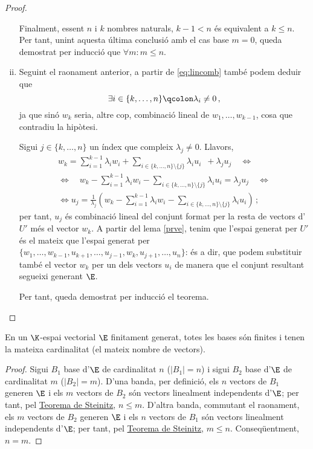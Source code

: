 \begin{specialteo}
\begin{proof}
\begin{enumerate}[i)]
			Finalment, essent $n$ i $k$ nombres naturals, $k-1 < n$ és equivalent a $k \le n$. Per tant, unint aquesta última conclusió amb el cas base $m=0$, queda demostrat per inducció que $\forall m \colon m \le n$.

			\item Seguint el raonament anterior, a partir de \eqref{eq:lincomb} també podem deduir que \[\exists i\in\{k,\ldots,n\}\qcolon \lambda_i \ne 0\,,\] ja que sinó $w_k$ seria, altre cop, combinació lineal de $w_1, \ldots, w_{k-1}$, cosa que contradiu la hipòtesi.
			
			Sigui $j\in\{k, \ldots, n\}$ un índex que compleix $\lambda_j \ne 0$. Llavors,
			\begin{gather*}
				w_k = \sum_{i=1}^{k-1} \lambda_i w_i + \sum_{i \in \{k, \ldots, n\}\setminus \{j\}} \lambda_i u_i  \ \;+ \lambda_j u_j\quad\Leftrightarrow\\
				\Leftrightarrow\quad w_k - \sum_{i=1}^{k-1} \lambda_i w_i - \sum_{i \in \{k, \ldots, n\}\setminus \{j\}} \lambda_i u_i = \lambda_j u_j\quad\Leftrightarrow\\
				\Leftrightarrow u_j = \frac{1}{\lambda_j}\left(w_k - \sum_{i=1}^{k-1} \lambda_i w_i - \sum_{i \in \{k, \ldots, n\}\setminus \{j\}} \lambda_i u_i\right)\,;
			\end{gather*}
			per tant, $u_j$ és combinació lineal del conjunt format per la resta de vectors d'$U'$ més el vector $w_k$. A partir del lema \ref{prve}, tenim que l'espai generat per $U'$ és el mateix que l'espai generat per $\{w_1, \ldots, w_{k-1}, u_{k+1}, \ldots, u_{j-1}, w_k, u_{j+1} , \ldots, u_n\}$: és a dir, que podem substituir també el vector $w_k$ per un dels vectors $u_i$ de manera que el conjunt resultant segueixi generant $\E$. 
			
			Per tant, queda demostrat per inducció el teorema.
		\end{enumerate}
	\end{proof}
	
	\begin{col}
		En un $\K$-espai vectorial $\E$ finitament generat, totes les bases són finites i tenen la mateixa cardinalitat (el mateix nombre de vectors).
	\end{col}
	
	\begin{proof} Sigui $B_1$ base d'$\E$  de cardinalitat $n$ ($|B_1| = n$) i sigui $B_2$ base d'$\E$ de cardinalitat $m$ ($|B_2| = m$). D'una banda, per definició, els $n$ vectors de $B_1$ generen $\E$ i els $m$ vectors de $B_2$ són vectors linealment independents d'$\E$; per tant, pel \hyperref[teo:steinitz]{Teorema de Steinitz}, $n \le m$. D'altra banda, commutant el raonament, els $m$ vectors de $B_2$ generen $\E$ i els $n$ vectors de $B_1$ són vectors linealment independents d'$\E$; per tant, pel \hyperref[teo:steinitz]{Teorema de Steinitz}, $m \le n$.  Conseqüentment, $n=m$.
	\end{proof}
\end{specialteo}




